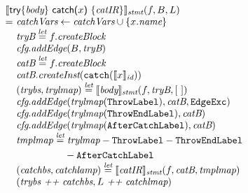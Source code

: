 \[\begin{array}{l@{}l@{~}l}
\lefteqn{\transfun{\ircfgtrycat{\emph{body}}{x}{\emph{catIR}}}_{\emph{stmt}}(f, B, L)}\\
& = & \emph{catchVars} \leftarrow \emph{catchVars} \cup \{ x.\emph{name} \}\\
& & \emph{tryB} \letval f.\emph{createBlock}\\
& & \emph{cfg}.\emph{addEdge}(B, \emph{tryB})\\
& & \emph{catB} \letval f.\emph{createBlock}\\
& & \emph{catB}.\emph{createInst}(\TT{catch}(\transfun{x}_{\emph{id}}))\\
& & (\emph{trybs}, \emph{trylmap}) \letval \transfun{\emph{body}}_{\emph{stmt}}(f, \emph{tryB}, [\ ])\\
& & \emph{cfg}.\emph{addEdge}(\emph{trylmap}(\ThrowLabel), \emph{catB}, \EdgeExc)\\
& & \emph{cfg}.\emph{addEdge}(\emph{trylmap}(\ThrowEndLabel), \emph{catB})\\
& & \emph{cfg}.\emph{addEdge}(\emph{trylmap}(\AfterCatchLabel), \emph{catB})\\
& & \emph{tmplmap} \letval \emph{trylmap} - \ThrowLabel - \ThrowEndLabel\\
&& \phantom{\emph{tmplmap} \letval} - \AfterCatchLabel\\
& & (\emph{catchbs}, \emph{catchlamp}) \letval \transfun{\emph{catIR}}_{\emph{stmt}}(f, \emph{catB}, \emph{tmplmap})\\
& & (\emph{trybs} ~\emph{++}~ \emph{catchbs}, L ~\emph{++}~ \emph{catchlmap})\\
& & \\


\end{array}\]
